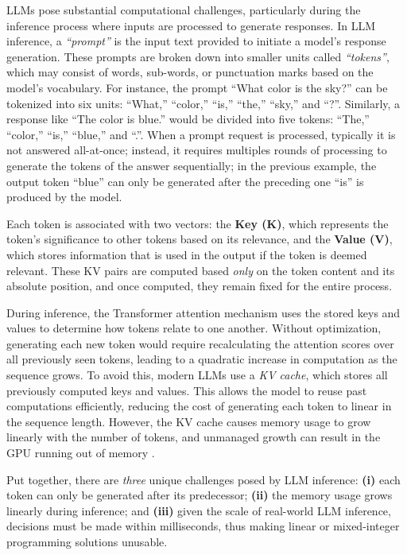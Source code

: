 \documentclass[11pt, a4paper]{article}
\theoremstyle{plain}
\theoremstyle{definition}
\theoremstyle{remark}
\begin{document}
 LLMs pose substantial computational challenges, particularly during the inference process where inputs are processed to generate responses. In LLM inference, a \emph{``prompt''} is the input text provided to initiate a model's response generation. These prompts are broken down into smaller units called \emph{``tokens''}, which may consist of words, sub-words, or punctuation marks based on the model's vocabulary.
For instance,
the prompt “What color is the sky?” can be tokenized into six units: “What,” “color,” “is,” “the,” “sky,” and “?”. Similarly, a response like “The color is blue.” would be divided into five tokens: “The,” “color,” “is,” “blue,” and “.”. When a prompt request is processed, typically it is not answered all-at-once; instead, it requires multiples rounds of processing to generate the tokens of the answer sequentially; in the previous example, the output token ``blue'' can only be generated after the preceding one ``is'' is produced by the model.   

Each token is associated with two vectors: the \textbf{Key (K)}, which represents the token's significance to other tokens based on its relevance, and the \textbf{Value (V)}, which stores information that is used in the output if the token is deemed relevant. These KV pairs are computed based \emph{only} on the token content and its absolute position, and once computed, they remain fixed for the entire process.

During inference, the Transformer attention mechanism \citep{vaswani2017attention} uses the stored keys and values to determine how tokens relate to one another. Without optimization, generating each new token would require recalculating the attention scores over all previously seen tokens, leading to a quadratic increase in computation as the sequence grows. To avoid this, modern LLMs use a \emph{KV cache}, which stores all previously computed keys and values. This allows the model to reuse past computations efficiently, reducing the cost of generating each token to linear in the sequence length. However, the KV cache causes memory usage to grow linearly with the number of tokens, and unmanaged growth can result in the GPU running out of memory \citep{hooper2024kvquant,kang2024gear}.


Put together, there are \emph{three} unique challenges posed by LLM inference: {\bf (i)} each token can only be generated after its predecessor; {\bf (ii)} the memory usage grows linearly during inference; and {\bf (iii)} given the scale of real-world LLM inference, decisions must be made within milliseconds, thus making linear or mixed-integer programming solutions unusable. 
\end{document}
